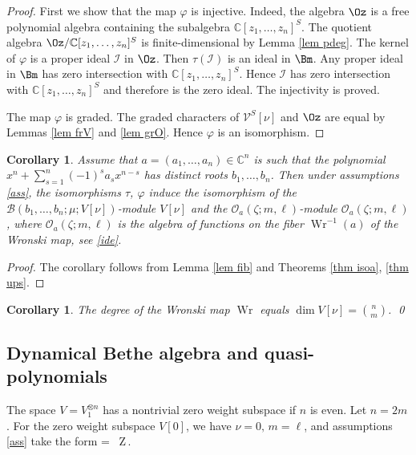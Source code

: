 \documentclass[12pt]{amsart}
\newtheorem{cor}[thm]{Corollary}
\numberwithin{equation}{section}
\theoremstyle{definition}
\let\mc\mathcal
\let\phi\varphi
\let\ox\otimes
\let\on\operatorname
\def\C{{\mathbb C}}
\def\Z{{\mathbb Z}}
\def\B{{\mc B}}
\def\O{{\mc O}}
\def\V{{\mc V}}
\def\O{{\mc O}}
\def\Wr{\on{Wr}}
\begin{document}
\begin{proof}
First we show that the map $\phi$ is injective. Indeed,
the algebra $\Oz$ is a free polynomial algebra containing the subalgebra $\C[z_1,\dots,z_n]^S$.
The quotient algebra $\Oz/\C[z_1,\dots,z_n]^S$ is finite-dimensional by Lemma \ref{lem pdeg}.
The  kernel of $\phi$ is a proper ideal $\mc I$ in $\Oz$. Then $\tau(\mc I)$ is an ideal in $\Bm$.
Any proper ideal in $\Bm$ has zero intersection with $\C[z_1,\dots,z_n]^S$. Hence
$\mc I$ has zero intersection with $\C[z_1,\dots,z_n]^S$ and therefore is 
the zero ideal. The injectivity is proved.

The map $\phi$ is graded. 
The graded characters of $\V^S[\nu]$ and $\Oz$ are equal by Lemmas \ref{lem frV}    and  \ref{lem grO}.
Hence $\phi$ is an isomorphism.
\end{proof}



\begin{cor}
\label{lem isofi}
Assume that $a=(a_1,\dots,a_n)\in \C^n$ is such that the polynomial 
$x^n + \sum_{s=1}^n(-1)^s a_sx^{n-s}$ has distinct roots
$b_1,\dots,b_n$. Then under  assumptions \eqref{ass}, the isomorphisms 
$\tau$, $\phi$ induce the isomorphism of  the $\B(b_1,\dots,b_n;\mu; V[\nu])$-module
$V[\nu]$ and the $\O_a(\zeta;m,\ell)$-module $\O_a(\zeta;m,\ell)$, where
$\O_a(\zeta;m,\ell)$ is the algebra of functions on the fiber $\Wr^{-1}(a)$
of the Wronski map, see  \eqref{ide}.
\end{cor}


\begin{proof}
The corollary follows from Lemma \ref{lem fib} and Theorems \ref{thm isoa}, \ref{thm ups}.
\end{proof}




\begin{cor}
\label{cor deg}
The degree of the Wronski map $\Wr$ equals $\dim V[\nu] = \binom{n}{m}$.
\qed
\end{cor}

\subsection{Dynamical Bethe algebra and quasi-polynomials}

The space $V = V_1^{\ox n}$ has a nontrivial zero weight subspace if $n$ is even.
Let $n=2m$. For the zero weight subspace $V[0]$,
 we have $\nu=0, \,m=\ell$, and 
assumptions \eqref{ass} take the form
\bean
\label{asss}
\zeta = \frac{} \quad \on{and} \quad 
\mu\notin\  \Z\,.
\eean
\smallskip
\end{document}
